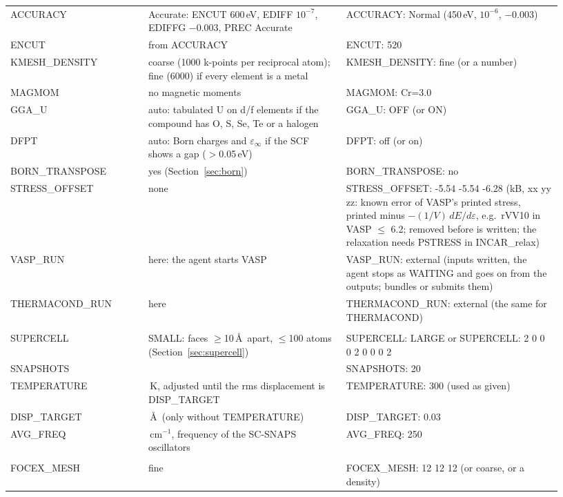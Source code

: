 \documentclass[11pt,a4paper]{scrartcl}
\newcommand{\cmd}[1]{\texttt{\detokenize{#1}}}
\begin{document}
\begin{longtable}{@{}>{\ttfamily\raggedright\arraybackslash}p{0.235\linewidth}>{\raggedright\arraybackslash}p{0.33\linewidth}>{\ttfamily\raggedright\arraybackslash}p{0.365\linewidth}@{}}
ACCURACY & Accurate: ENCUT 600\,eV, EDIFF $10^{-7}$, EDIFFG $-0.003$, PREC Accurate &
  ACCURACY: Normal \quad (450\,eV, $10^{-6}$, $-0.003$) \\
ENCUT & from ACCURACY & ENCUT: 520 \\
KMESH\_DENSITY & coarse (1000 k-points per reciprocal atom); fine (6000) if every element is a metal &
  KMESH\_DENSITY: fine \quad (or a number) \\
MAGMOM & no magnetic moments & MAGMOM: Cr=3.0 \\
GGA\_U & auto: tabulated U on d/f elements if the compound has O, S, Se, Te or a halogen & GGA\_U: OFF
  \quad (or ON) \\
DFPT & auto: Born charges and $\varepsilon_\infty$ if the SCF shows a gap ($>$0.05\,eV) & DFPT: off
  \quad (or on) \\
BORN\_TRANSPOSE & yes (Section~\ref{sec:born}) & BORN\_TRANSPOSE: no \\
STRESS\_OFFSET & none & STRESS\_OFFSET: -5.54 -5.54 -6.28 \quad (kB, xx yy zz: known error of VASP's printed
  stress, printed minus $-(1/V)\,dE/d\varepsilon$, e.g.\ rVV10 in VASP $\le$ 6.2; removed before
  \cmd{stress.params} is written; the relaxation needs PSTRESS in INCAR\_relax) \\
VASP\_RUN & here: the agent starts VASP & VASP\_RUN: external \quad (inputs written, the agent stops as
  WAITING and goes on from the outputs; \cmd{aladyn-gui} bundles or submits them) \\
THERMACOND\_RUN & here & THERMACOND\_RUN: external \quad (the same for THERMACOND) \\
\multicolumn{3}{@{}l}{\textcolor{mainblue}{\textbf{snapshots}}} \\
SUPERCELL & SMALL: faces $\geq$10\,\AA\ apart, $\leq$100 atoms (Section~\ref{sec:supercell}) &
  SUPERCELL: LARGE \quad or \quad SUPERCELL: 2 0 0 0 2 0 0 0 2 \\
SNAPSHOTS & 50 & SNAPSHOTS: 20 \\
TEMPERATURE & 30\,K, adjusted until the rms displacement is DISP\_TARGET & TEMPERATURE: 300 \quad (used
  as given) \\
DISP\_TARGET & 0.02\,\AA\ (only without TEMPERATURE) & DISP\_TARGET: 0.03 \\
AVG\_FREQ & 400\,cm$^{-1}$, frequency of the SC-SNAPS oscillators & AVG\_FREQ: 250 \\
\multicolumn{3}{@{}l}{\textcolor{mainblue}{\textbf{FOCEX}}} \\
FOCEX\_MESH & fine & FOCEX\_MESH: 12 12 12 \quad (or coarse, or a density) \\

\end{longtable}
\end{document}
